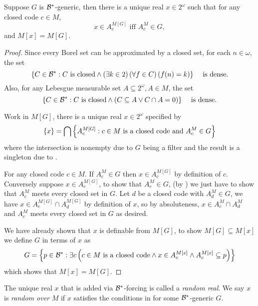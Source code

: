 \begin{theorem} \label{theorem:random_real}
    Suppose \(G\) is \({\mathcal{B}}^*\)-generic,
    then there is a unique real \(x \in 2^\omega\) such that for any closed code \(c\in M\),
    \[ x\in A_c^{M[G]} \text{ iff } A_c^M \in G, \]
    and \(M[x] = M[G]\).
\end{theorem}
\begin{proof}
    Since every Borel set can be approximated by a closed set, for each \(n\in\omega\), the set
    \begin{equation} \label{eqn:borel_algebra_dense}
        {\left\{ C\in {\mathcal{B}}^*: C\text{ is closed} \land \left(\exists k\in2\right)\left(\forall f\in C\right)\left(f(n) = k\right)  \right\}}\quad\text{ is dense.}
    \end{equation}
    Also, for any Lebesgue measurable set \(A\subseteq 2^\omega, A\in M\), the set
    \begin{equation} \label{eqn:borel_algebra_dense2}
        {\left\{ C\in {\mathcal{B}}^*: C\text{ is closed} \land \left(C\subseteq A\lor C\cap A = 0\right)  \right\}}\quad\text{ is dense.}
    \end{equation}

    Work in \(M[G]\), there is a unique real \(x\in2^\omega\) specified by
    \[ {\left\{ x \right\}} = \bigcap{\left\{ A_c^{M[G]}: c\in M \text{ is a closed code and } A_c^M\in G \right\}} \]
    where the intersection is nonempty due to \(G\) being a filter and the result is a singleton due to .

    For any closed code \(c\in M\).  If \(A_c^M\in G\) then \(x\in A_c^{M[G]}\) by definition of \(c\).
    Conversely suppose \(x\in A_c^{M[G]}\),
    to show that \(A_c^M\in G\), (by )
    we just have to show that \(A_c^M\) meets every closed set in \(G\).
    Let \(d\) be a closed code with \(A_d^M\in G\),
    we have \(x \in A_c^{M[G]} \cap A_d^{M[G]}\) by definition of \(x\),
    so by absoluteness, \(x \in A_c^M \cap A_d^M\) and \(A_c^M\) meets every closed set in \(G\) as desired.

    We have already shown that \(x\) is definable from \(M[G]\),
    to show \(M[G]\subseteq M[x]\) we define \(G\) in terms of \(x\) as
    \[ G = {\left\{ p\in{\mathcal{B}}^* : \exists c\left(c\in M\text{ is a closed code} \land x\in A_c^{M[x]} \land A_c^{M[x]} \subseteq p\right)  \right\}} \]
    which shows that \(M[x] = M[G]\).
\end{proof}

\begin{definition}
    The unique real \(x\) that is added via \({\mathcal{B}}^*\)-forcing is called a \emph{random real}.
    We say \(x\) is \emph{random over} \(M\) if \(x\) satisfies the conditions in 
    for some \({\mathcal{B}}^*\)-generic \(G\).
\end{definition}

